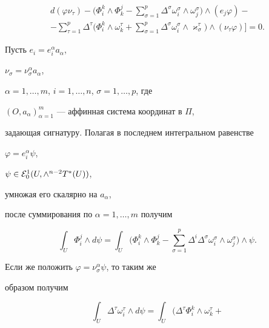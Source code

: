 \begin{pf}
\begin{gather*}
d(\varphi\nu_{\tau})-


\biggl(\Phi^k_i\wedge\Phi^j_k


-\sum_{\sigma=1}^{p}


\Delta^{\sigma}\omega^{\sigma}_i\wedge\omega^\sigma_j


\biggr)\wedge(e_j\varphi)-\\


-\sum_{\tau=1}^{p}\Delta^{\tau}\biggl(\Phi^k_i\wedge\omega^{\tau}_k+


\sum_{\sigma=1}^{p}\Delta^{\sigma}\omega^{\sigma}_i\wedge


\varkappa^{\tau}_{\sigma}\biggr)\wedge(\nu_{\tau}\varphi)\biggr]=0.


\end{gather*}





Пусть $e_i= e^{\alpha}_ia_{\alpha}$,


$\nu_{\sigma}=\nu_{\sigma}^{\alpha}a_{\alpha}$,


$\alpha= 1,\dotsc,m$, $i= 1,\dotsc,n$, $\sigma= 1,\dotsc,p$, где


$(O,a_{\alpha})_{\alpha=1}^m$ --- аффинная система координат в $\Pi$,


задающая сигнатуру. Полагая в последнем интегральном равенстве


$\varphi= e^{\alpha}_i\psi$,


$\psi\in {\cal E}^1_0(U,\wedge^{n-2}T^*(U))$,


умножая его скалярно на $a_{\alpha}$,


после суммирования по $\alpha= 1,\ldots,m$ получим


\begin{equation}


\int_{U}\Phi^j_i\wedge d\psi=\int_{U}\biggl(\Phi^k_i\wedge\Phi^j_k-


\sum_{\sigma=1}^{p}\Delta^i\Delta^{\sigma}\omega^{\sigma}_i\wedge


\omega^{\sigma}_j\biggr)\wedge\psi.


\end{equation}


Если же положить $\varphi= \nu^{\alpha}_{\sigma}\psi$, то таким же


образом получим


\begin{equation}


\int_{U}\Delta^{\tau}\omega^{\tau}_i\wedge d\psi=


\int_{U}\biggl(\Delta^{\tau}\Phi^k_i\wedge\omega^{\tau}_k+



\end{equation}
\end{pf}
